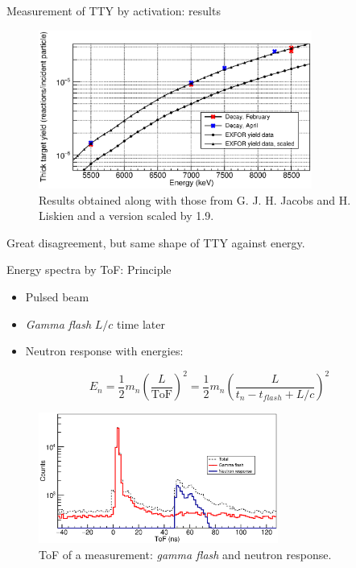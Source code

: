 \documentclass[11pt]{beamer}
\begin{document}
\begin{frame}{Measurement of TTY by activation: results}
	\begin{figure}[H]
		\centering
		\includegraphics[width=0.80\textwidth]{activation_final_results.eps}
		\caption{Results obtained along with those from G. J. H. Jacobs and H. Liskien \cite{jacobs} and a version scaled by \num{1.9}.}
		\label{activation_final_results}
	\end{figure}
	Great disagreement, but same shape of TTY against energy.
\end{frame}







\begin{frame}{Energy spectra by ToF: Principle}
	\begin{itemize}
		\item Pulsed beam
		\item \textit{Gamma flash} $L/c$ time later
		\item Neutron response with energies:
	\end{itemize}
	\begin{equation}
		E_n=\frac{1}{2} m_n \left( \frac{L}{\text{ToF}} \right)^2 = \frac{1}{2} m_n \left( \frac{L}{t_n - t_{flash} + L/c} \right)^2
	\end{equation}
	\begin{figure}[H]
		\centering
		\includegraphics[width=0.70\textwidth]{separated_tof.eps}
		\caption{ToF of a measurement: \textit{gamma flash} and neutron response.}
		\label{separated_tof}
	\end{figure}
\end{frame}
\end{document}
